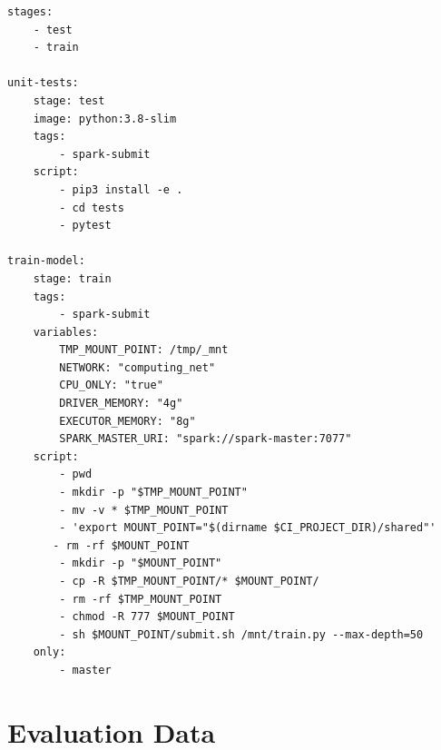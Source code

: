 \begin{lstlisting}[label=lst:appendix_ci-pipeline_job, caption=texttt{.gitlab-ci.yml} configuration file]
stages:
    - test
    - train
 
unit-tests:
    stage: test
    image: python:3.8-slim
    tags:
        - spark-submit
    script:
        - pip3 install -e .
        - cd tests
        - pytest
 
train-model:
    stage: train
    tags:
        - spark-submit
    variables:
        TMP_MOUNT_POINT: /tmp/_mnt
        NETWORK: "computing_net"
        CPU_ONLY: "true"
        DRIVER_MEMORY: "4g"
        EXECUTOR_MEMORY: "8g"
        SPARK_MASTER_URI: "spark://spark-master:7077"
    script:
        - pwd
        - mkdir -p "$TMP_MOUNT_POINT"
        - mv -v * $TMP_MOUNT_POINT
        - 'export MOUNT_POINT="$(dirname $CI_PROJECT_DIR)/shared"'
       - rm -rf $MOUNT_POINT
        - mkdir -p "$MOUNT_POINT"
        - cp -R $TMP_MOUNT_POINT/* $MOUNT_POINT/
        - rm -rf $TMP_MOUNT_POINT
        - chmod -R 777 $MOUNT_POINT
        - sh $MOUNT_POINT/submit.sh /mnt/train.py --max-depth=50
    only:
        - master
\end{lstlisting}


\section{Evaluation Data}
\label{sec:appendix_eval}

